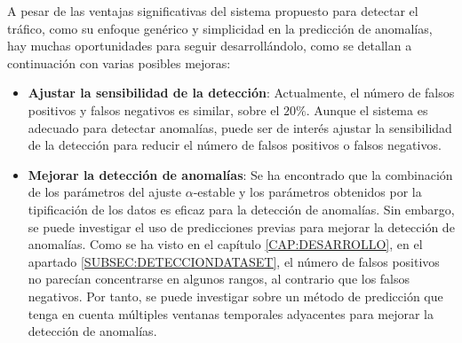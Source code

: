 A pesar de las ventajas significativas del sistema propuesto para detectar el tráfico, como su enfoque genérico y simplicidad en la predicción de anomalías, hay muchas oportunidades para seguir desarrollándolo, como se detallan a continuación con varias posibles mejoras:
\begin{itemize}
    \item \textbf{Ajustar la sensibilidad de la detección}: Actualmente, el número de falsos positivos y falsos negativos es similar, sobre el $20\%$. Aunque el sistema es adecuado para detectar anomalías, puede ser de interés ajustar la sensibilidad de la detección para reducir el número de falsos positivos o falsos negativos.
    \item \textbf{Mejorar la detección de anomalías}: Se ha encontrado que la combinación de los parámetros del ajuste $\alpha$-estable y los parámetros obtenidos por la tipificación de los datos es eficaz para la detección de anomalías. Sin embargo, se puede investigar el uso de predicciones previas para mejorar la detección de anomalías. Como se ha visto en el capítulo \ref{CAP:DESARROLLO}, en el apartado \ref{SUBSEC:DETECCIONDATASET}, el número de falsos positivos no parecían concentrarse en algunos rangos, al contrario que los falsos negativos. Por tanto, se puede investigar sobre un método de predicción que tenga en cuenta múltiples ventanas temporales adyacentes para mejorar la detección de anomalías.
\end{itemize}